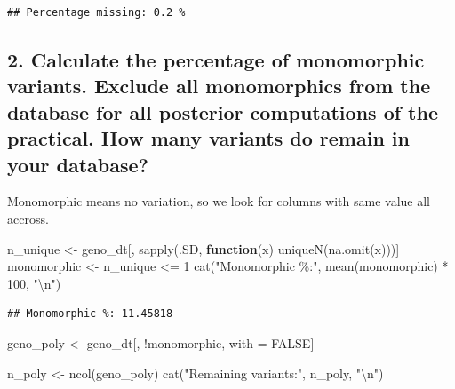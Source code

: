 \documentclass[
]{article}
\newenvironment{Shaded}{\begin{snugshade}}{\end{snugshade}}
\newcommand{\ConstantTok}[1]{\textcolor[rgb]{0.00,0.00,0.00}{#1}}
\newcommand{\ControlFlowTok}[1]{\textcolor[rgb]{0.13,0.29,0.53}{\textbf{#1}}}
\newcommand{\DecValTok}[1]{\textcolor[rgb]{0.00,0.00,0.81}{#1}}
\newcommand{\FunctionTok}[1]{\textcolor[rgb]{0.00,0.00,0.00}{#1}}
\newcommand{\NormalTok}[1]{#1}
\newcommand{\OtherTok}[1]{\textcolor[rgb]{0.56,0.35,0.01}{#1}}
\newcommand{\SpecialCharTok}[1]{\textcolor[rgb]{0.00,0.00,0.00}{#1}}
\newcommand{\StringTok}[1]{\textcolor[rgb]{0.31,0.60,0.02}{#1}}
\begin{document}
\begin{verbatim}
## Percentage missing: 0.2 %
\end{verbatim}

\hypertarget{calculate-the-percentage-of-monomorphic-variants.-exclude-all-monomorphics-from-the-database-for-all-posterior-computations-of-the-practical.-how-many-variants-do-remain-in-your-database}{%
\subsection{2. Calculate the percentage of monomorphic variants. Exclude
all monomorphics from the database for all posterior computations of the
practical. How many variants do remain in your
database?}\label{calculate-the-percentage-of-monomorphic-variants.-exclude-all-monomorphics-from-the-database-for-all-posterior-computations-of-the-practical.-how-many-variants-do-remain-in-your-database}}

Monomorphic means no variation, so we look for columns with same value
all accross.

\begin{Shaded}
\begin{Highlighting}[]
\NormalTok{n\_unique }\OtherTok{\textless{}{-}}\NormalTok{ geno\_dt[, }\FunctionTok{sapply}\NormalTok{(.SD, }\ControlFlowTok{function}\NormalTok{(x) }\FunctionTok{uniqueN}\NormalTok{(}\FunctionTok{na.omit}\NormalTok{(x)))]}
\NormalTok{monomorphic }\OtherTok{\textless{}{-}}\NormalTok{ n\_unique }\SpecialCharTok{\textless{}=} \DecValTok{1}
\FunctionTok{cat}\NormalTok{(}\StringTok{"Monomorphic \%:"}\NormalTok{, }\FunctionTok{mean}\NormalTok{(monomorphic) }\SpecialCharTok{*} \DecValTok{100}\NormalTok{, }\StringTok{"}\SpecialCharTok{\textbackslash{}n}\StringTok{"}\NormalTok{)}
\end{Highlighting}
\end{Shaded}

\begin{verbatim}
## Monomorphic %: 11.45818
\end{verbatim}

\begin{Shaded}
\begin{Highlighting}[]
\NormalTok{geno\_poly }\OtherTok{\textless{}{-}}\NormalTok{ geno\_dt[, }\SpecialCharTok{!}\NormalTok{monomorphic, with }\OtherTok{=} \ConstantTok{FALSE}\NormalTok{]}

\NormalTok{n\_poly }\OtherTok{\textless{}{-}} \FunctionTok{ncol}\NormalTok{(geno\_poly)}
\FunctionTok{cat}\NormalTok{(}\StringTok{"Remaining variants:"}\NormalTok{, n\_poly, }\StringTok{"}\SpecialCharTok{\textbackslash{}n}\StringTok{"}\NormalTok{)}
\end{Highlighting}
\end{Shaded}
\end{document}
